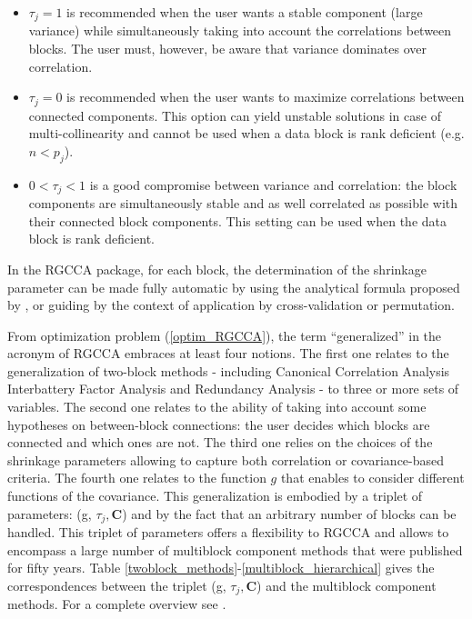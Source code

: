 \documentclass[
]{jss}
\begin{document}
\begin{itemize}
\item   $\tau_j=1$ is recommended when the user wants a stable component (large 
variance) while simultaneously taking into account the correlations between 
blocks. The user must, however, be aware that variance dominates over 
correlation.

\item   $\tau_j=0$ is recommended when the user wants to maximize correlations 
between connected components. This option can yield unstable solutions in case 
of multi-collinearity and cannot be used when a data block is rank deficient 
(e.g. $n<p_j$).

\item   $0<\tau_j<1$ is a good compromise between variance and correlation: the 
block components are simultaneously stable and as well correlated as possible 
with their connected block components. This setting can be used when the data 
block is rank deficient.
\end{itemize}

In the RGCCA package, for each block, the determination of the shrinkage
parameter can be made fully automatic by using the analytical formula
proposed by \citep{Schafer2005}, or guiding by the context of
application by cross-validation or permutation.

From optimization problem (\ref{optim_RGCCA}), the term ``generalized''
in the acronym of RGCCA embraces at least four notions. The first one
relates to the generalization of two-block methods - including Canonical
Correlation Analysis \citep{Hotelling1936} Interbattery Factor Analysis
\citep{Tucker1958} and Redundancy Analysis \citep{Wollenberg1977} - to
three or more sets of variables. The second one relates to the ability
of taking into account some hypotheses on between-block connections: the
user decides which blocks are connected and which ones are not. The
third one relies on the choices of the shrinkage parameters allowing to
capture both correlation or covariance-based criteria. The fourth one
relates to the function \(g\) that enables to consider different
functions of the covariance. This generalization is embodied by a
triplet of parameters: (g, \(\tau_j, \mathbf C\)) and by the fact that
an arbitrary number of blocks can be handled. This triplet of parameters
offers a flexibility to RGCCA and allows to encompass a large number of
multiblock component methods that were published for fifty years. Table
\ref{twoblock_methods}-\ref{multiblock_hierarchical} gives the
correspondences between the triplet (g, \(\tau_j, \mathbf C\)) and the
multiblock component methods. For a complete overview see
\citep{Tenenhaus2017}.
\end{document}
